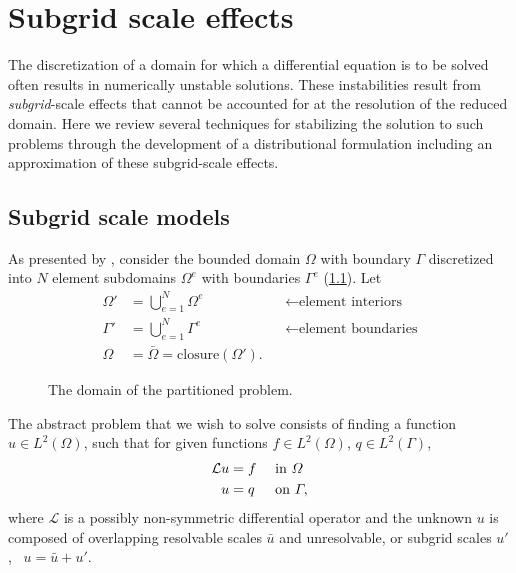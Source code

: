 
\chapter{Subgrid scale effects} \label{ssn_subgrid_scale_effects}

The discretization of a domain for which a differential equation is to be solved often results in numerically unstable solutions.  These instabilities result from \emph{subgrid}-scale effects that cannot be accounted for at the resolution of the reduced domain.  Here we review several techniques for stabilizing the solution to such problems through the development of a distributional formulation including an approximation of these subgrid-scale effects.




\section{Subgrid scale models}

As presented by \citet{hughes_1995}, consider the bounded domain $\Omega$ with boundary $\Gamma$ discretized into $N$ element subdomains $\Omega^e$ with boundaries $\Gamma^e$ (\cref{subgrid_domain_image}).  Let
\begin{align*}
  \Omega' &= \bigcup_{e=1}^{N} \Omega^e  &&\leftarrow \text{element interiors} \\
  \Gamma' &= \bigcup_{e=1}^{N} \Gamma^e  &&\leftarrow \text{element boundaries} \\
  \Omega &= \bar{\Omega} = \mathrm{closure}(\Omega'). 
\end{align*}

\begin{figure}
  \centering
    \def\svgwidth{\linewidth}
    
  \caption[The discrete model]{The domain of the partitioned problem.}
  \label{subgrid_domain_image}
\end{figure}

The abstract problem that we wish to solve consists of finding a function $u \in L^2(\Omega)$, such that for given functions $f \in L^2(\Omega)$, $q \in L^2(\Gamma)$,
\begin{align}
  \label{bubble_diff_eq}
  \mathcal{L} u &= f &&\text{ in } \varOmega \\
  \label{bubble_bc}
  u &= q     &&\text{ on } \varGamma,
\end{align}
where $\mathcal{L}$ is a possibly non-symmetric differential operator and the unknown $u$ is composed of overlapping resolvable scales $\bar{u}$ and unresolvable, or subgrid scales $u'$, \ie\ $u = \bar{u} + u'$.

